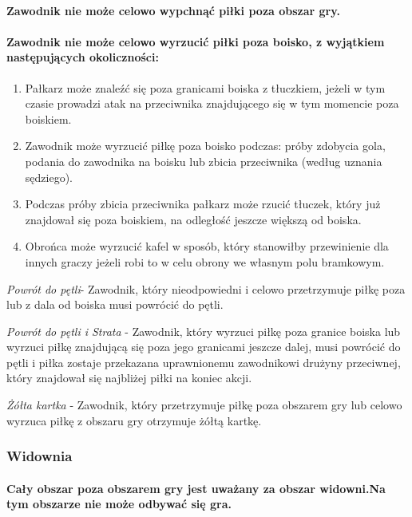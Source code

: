\documentclass[12pt]{article}
\begin{document}
\paragraph{Zawodnik nie może celowo wypchnąć piłki poza obszar gry.}

\paragraph{Zawodnik nie może celowo wyrzucić piłki poza boisko, z
wyjątkiem następujących okoliczności:}

\begin{enumerate}
\item
    Pałkarz może znaleźć się poza granicami boiska z tłuczkiem, jeżeli w
  tym czasie prowadzi atak na przeciwnika znajdującego się w tym
  momencie poza boiskiem.
  \item
    Zawodnik może wyrzucić piłkę poza boisko podczas: próby zdobycia gola,
  podania do zawodnika na boisku lub zbicia przeciwnika (według uznania
  sędziego).
  \item
    Podczas próby zbicia przeciwnika pałkarz może rzucić tłuczek, który
  już znajdował się poza boiskiem, na odległość jeszcze większą od
  boiska.
  \item
    Obrońca może wyrzucić kafel w sposób, który stanowiłby przewinienie
  dla innych graczy jeżeli robi to w celu obrony we własnym polu
  bramkowym.
  \end{enumerate}

\emph{Powrót do pętli}- Zawodnik, który nieodpowiedni i celowo
przetrzymuje piłkę poza lub z dala od boiska musi powrócić do pętli.

\emph{Powrót do pętli i Strata} - Zawodnik, który wyrzuci piłkę poza
granice boiska lub wyrzuci piłkę znajdującą się poza jego granicami
jeszcze dalej, musi powrócić do pętli i piłka zostaje przekazana
uprawnionemu zawodnikowi drużyny przeciwnej, który znajdował się
najbliżej piłki na koniec akcji.

\emph{Żółta kartka} - Zawodnik, który przetrzymuje piłkę poza obszarem
gry lub celowo wyrzuca piłkę z obszaru gry otrzymuje żółtą kartkę.

\subsubsection{Widownia}

\paragraph{ Cały obszar poza obszarem gry jest uważany za obszar
widowni.Na tym obszarze nie może odbywać się gra.}
\end{document}
